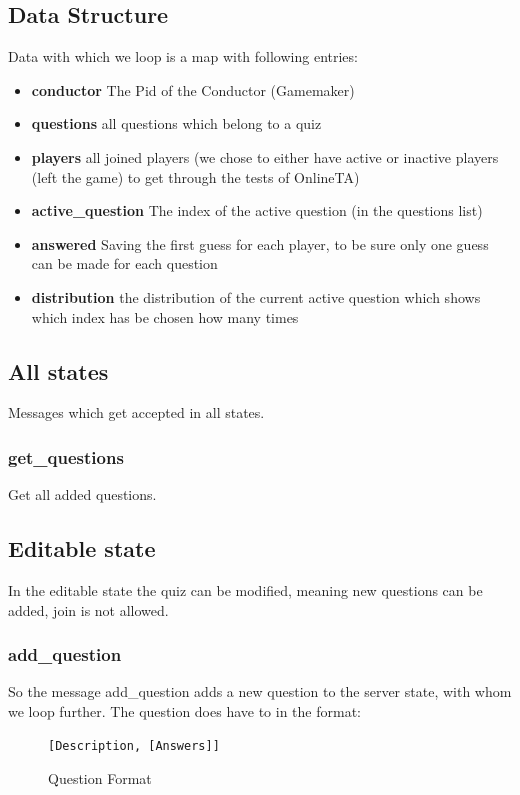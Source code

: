 \documentclass[12pt,a4paper]{article}
\begin{document}
\subsection{Data Structure}
Data with which we loop is a map with following entries:
\begin{itemize}
	\item \textbf{conductor} The Pid of the Conductor (Gamemaker)
	\item \textbf{questions} all questions which belong to a quiz
	\item \textbf{players} all joined players (we chose to either have active or inactive players (left the game) to get through the tests of OnlineTA)
	\item \textbf{active\_question} The index of the active question (in the questions list)
	\item \textbf{answered} Saving the first guess for each player, to be sure only one guess can be made for each question
	\item \textbf{distribution} the distribution of the current active question which shows which index has be chosen how many times
\end{itemize}

\subsection{All states}
Messages which get accepted in all states.
\subsubsection{get\_questions}
Get all added questions.

\subsection{Editable state}
In the editable state the quiz can be modified, meaning new questions can be added, join is not allowed.

\subsubsection{add\_question}
So the message add\_question adds a new question to the server state, with whom we loop further.
The question does have to in the format:
\begin{figure}[!htb]
\begin{verbatim}
[Description, [Answers]]
\end{verbatim}
\caption{Question Format}
\end{figure}
\end{document}
